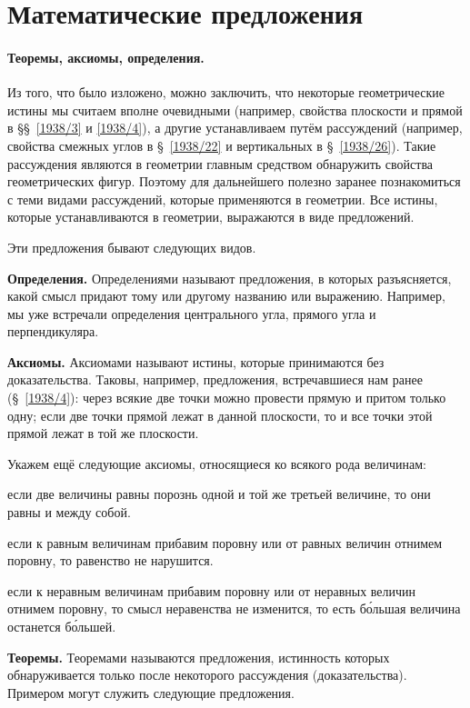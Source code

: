 \section{Математические предложения}

\paragraph{Теоремы, аксиомы, определения.}\label{1938/28}
Из того, что было изложено, можно заключить, что некоторые геометрические истины мы считаем вполне очевидными (например, свойства плоскости и прямой в §§~\ref{1938/3} и \ref{1938/4}), а другие устанавливаем путём рассуждений (например, свойства смежных углов в §~\ref{1938/22} и вертикальных в §~\ref{1938/26}).
Такие рассуждения являются в геометрии главным средством обнаружить свойства геометрических фигур.
Поэтому для дальнейшего полезно заранее познакомиться с теми видами рассуждений, которые применяются в геометрии.
Все истины, которые устанавливаются в геометрии, выражаются в виде предложений.

Эти предложения бывают следующих видов.

\textbf{Определения.}
Определениями называют предложения, в которых разъясняется, какой смысл придают тому или другому названию или выражению.
Например, мы уже встречали определения центрального угла, прямого угла и перпендикуляра.

\textbf{Аксиомы.}
Аксиомами называют истины, которые принимаются без доказательства.
Таковы, например, предложения, встречавшиеся нам ранее (§~\ref{1938/4}):
через всякие две точки можно провести прямую и притом только одну;
если две точки прямой лежат в данной плоскости, то и все точки этой прямой лежат в той же плоскости.

Укажем ещё следующие аксиомы, относящиеся ко всякого рода величинам:

если две величины равны порознь одной и той же третьей величине, то они равны и между собой.

если к равным величинам прибавим поровну или от равных величин отнимем поровну, то равенство не нарушится.

если к неравным величинам прибавим поровну или от неравных величин отнимем поровну, то смысл неравенства не изменится, то есть б\'{о}льшая величина останется б\'{о}льшей.

\textbf{Теоремы.}
Теоремами называются предложения, истинность которых обнаруживается только после некоторого рассуждения (доказательства).
Примером могут служить следующие предложения.

